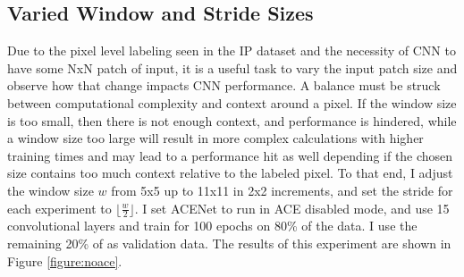 \documentclass[12pt]{article}
\begin{document}
\subsection{Varied Window and Stride Sizes}
Due to the pixel level labeling seen in the IP dataset and the necessity of CNN to have some NxN patch of input, it is a useful task to vary the input patch size and observe how that change impacts CNN performance. 
%
A balance must be struck between computational complexity and context around a pixel.
%
If the window size is too small, then there is not enough context, and performance is hindered, while a window size too large will result in more complex calculations with higher training times and may lead to a performance hit as well depending if the chosen size contains too much context relative to the labeled pixel.
%
To that end, I adjust the window size $w$ from 5x5 up to 11x11 in 2x2 increments, and set the stride for each experiment to $\lfloor\frac{w}{2}\rfloor$. 
%
I set ACENet to run in ACE disabled mode, and use 15 convolutional layers and train for 100 epochs on 80\% of the data.
%
I use the remaining 20\% of as validation data.
%
The results of this experiment are shown in Figure \ref{figure:noace}.
\end{document}
